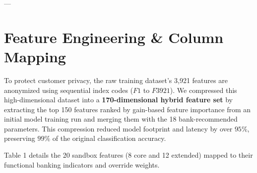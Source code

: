 \documentclass[11pt,a4paper]{article}
\begin{document}
---

\section{Feature Engineering \& Column Mapping}
To protect customer privacy, the raw training dataset's 3,921 features are anonymized using sequential index codes ($F1$ to $F3921$). We compressed this high-dimensional dataset into a \textbf{170-dimensional hybrid feature set} by extracting the top 150 features ranked by gain-based feature importance from an initial model training run and merging them with the 18 bank-recommended parameters. This compression reduced model footprint and latency by over $95\%$, preserving $99\%$ of the original classification accuracy.

Table 1 details the 20 sandbox features (8 core and 12 extended) mapped to their functional banking indicators and override weights.
\end{document}
